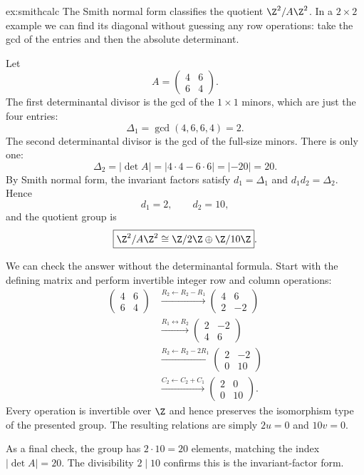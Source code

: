 \begin{solution}{ex:smithcalc}
\idea The Smith normal form classifies the quotient $\Z^2/A\Z^2$. In a $2\times2$ example we can find its diagonal without guessing any row operations: take the gcd of the entries and then the absolute determinant.

\writeup Let
\[
A=\begin{pmatrix}4&6\\6&4\end{pmatrix}.
\]
The first determinantal divisor is the gcd of the $1\times1$ minors, which are just the four entries:
\[
\Delta_1=\gcd(4,6,6,4)=2.
\]
The second determinantal divisor is the gcd of the full-size minors. There is only one:
\[
\Delta_2=|\det A|=|4\cdot4-6\cdot6|=|-20|=20.
\]
By Smith normal form, the invariant factors satisfy $d_1=\Delta_1$ and $d_1d_2=\Delta_2$. Hence
\[
d_1=2,\qquad d_2=10,
\]
and the quotient group is
\[
\boxed{\Z^2/A\Z^2\cong\Z/2\Z\oplus\Z/10\Z}.
\]

We can check the answer without the determinantal formula. Start with the defining matrix and perform invertible integer row and column operations:
\[
\begin{aligned}
\begin{pmatrix}4&6\\6&4\end{pmatrix}
&\xrightarrow{R_2\gets R_2-R_1}
\begin{pmatrix}4&6\\2&-2\end{pmatrix}\\
&\xrightarrow{R_1\leftrightarrow R_2}
\begin{pmatrix}2&-2\\4&6\end{pmatrix}\\
&\xrightarrow{R_2\gets R_2-2R_1}
\begin{pmatrix}2&-2\\0&10\end{pmatrix}\\
&\xrightarrow{C_2\gets C_2+C_1}
\begin{pmatrix}2&0\\0&10\end{pmatrix}.
\end{aligned}
\]
Every operation is invertible over $\Z$ and hence preserves the isomorphism type of the presented group. The resulting relations are simply $2u=0$ and $10v=0$.

As a final check, the group has $2\cdot10=20$ elements, matching the index $|\det A|=20$. The divisibility $2\mid10$ confirms this is the invariant-factor form.
\end{solution}

